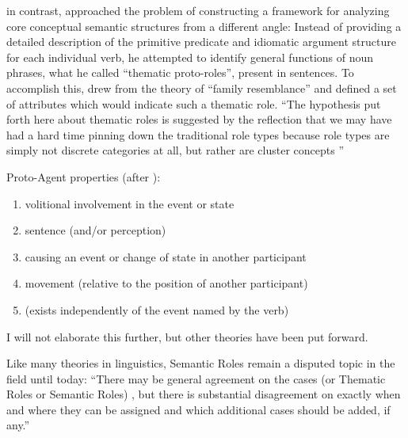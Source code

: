 \cite{dowty1991thematic} in contrast, approached the problem of constructing
a framework for analyzing core conceptual semantic structures from a different
angle: Instead of providing a detailed description of the primitive predicate and
idiomatic argument structure for each individual verb, he attempted to identify
general functions of noun phrases, what he called ``thematic proto-roles'',
present in sentences. To accomplish this, \citeauthor{dowty1991thematic} drew
from the theory of ``family resemblance'' and defined a set of attributes which
would indicate such a thematic role.
``The hypothesis put forth here about thematic roles is suggested by the
reflection that we may have had a hard time pinning down the traditional role
types because role types are simply not discrete categories at all, but rather
are cluster concepts \textelp{}'' \citep[p.~571]{dowty1991thematic}

Proto-Agent properties (after \citep[p.~572]{dowty1991thematic}):

\begin{enumerate}[label=\alph*]
  \item volitional involvement in the event or state
  \item sentence (and/or perception)
  \item causing an event or change of state in another participant
  \item movement (relative to the position of another participant)
  \item (exists independently of the event named by the verb)
\end{enumerate}

{\color{red} I will not elaborate this further, but other theories have been put forward.}

Like many theories in linguistics, Semantic Roles remain a disputed topic in the field until today:
``There may be general agreement on the cases (or Thematic Roles or Semantic Roles) \textelp{},
but there is substantial disagreement on exactly when and where they can be assigned and which
additional cases should be added, if any.'' \citep{palmer2010semantic}


